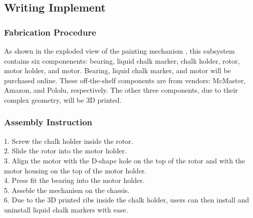 
\subsection{Writing Implement}
\label{sec:hardware_writing_implement}

\subsubsection{Fabrication Procedure}
\label{sec:writing_fab}
As shown in the exploded view of the painting mechanism , this subsystem contains six componenents: bearing, liquid chalk marker, chalk holder, rotor, motor holder, and motor. Bearing, liquid chalk marker, and motor will be purchased online. These off-the-shelf components are from vendors: McMaster, Amazon, and Pololu, respectively. The other three components, due to their complex geometry, will be 3D printed.

\subsubsection{Assembly Instruction}
\label{sec:writing_assemb}
1. Screw the chalk holder inside the rotor.\\
2. Slide the rotor into the motor holder. \\
3. Align the motor with the D-shape hole on the top of the rotor and with the motor housing on the top of the motor holder.\\
4. Press fit the bearing into the motor holder.\\
5. Asseble the mechanism on the chassis.\\
6. Due to the 3D printed ribs inside the chalk holder, users can then install and uninstall liquid chalk markers with ease.